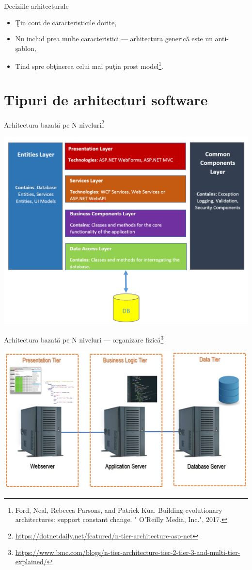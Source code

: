 \documentclass[presentation]{beamer}
\begin{document}
\begin{frame}[label={sec:org5b7d208}]{Deciziile arhitecturale}
\begin{itemize}
\item Ţin cont de caracteristicile dorite,
\item Nu includ prea multe caracteristici --- arhitectura generică este un anti-şablon,
\item Tind spre obţinerea celui mai puţin prost model\footnote{Ford, Neal, Rebecca Parsons, and Patrick Kua. Building evolutionary architectures: support constant change. " O'Reilly Media, Inc.", 2017.}.
\end{itemize}
\end{frame}
\section{Tipuri de arhitecturi software}
\label{sec:orgb941663}
\begin{frame}[label={sec:org70ab7ea}]{Arhitectura bazată pe N niveluri\footnote{\url{https://dotnetdaily.net/featured/n-tier-architecture-asp-net}}}
\begin{center}
\includegraphics[width=.9\linewidth]{img/n-tier-architecture.png}
\end{center}
\end{frame}
\begin{frame}[label={sec:orgf9d7d92}]{Arhitectura bazată pe N niveluri --- organizare fizică\footnote{\url{https://www.bmc.com/blogs/n-tier-architecture-tier-2-tier-3-and-multi-tier-explained/}}}
\begin{center}
\includegraphics[width=.9\linewidth]{img/n-tier-physical.png}
\end{center}
\end{frame}
\end{document}
